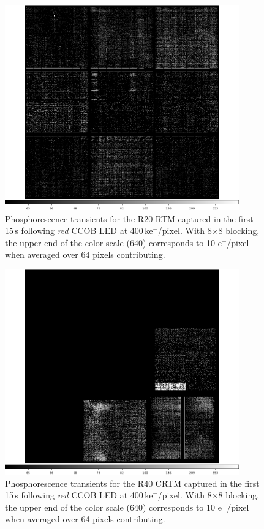 \begin{figure}[!htbp]
\centering
\includegraphics[width=0.9\textwidth]{figures/phosphorescence-survey/itl_fluor_R20_0-19_rb1_log.png}
\caption{Phosphorescence transients for the R20 RTM captured in the first 15\,s following {\it red} CCOB LED at 400\,ke$^-$/pixel. With 8$\times$8 blocking, the upper end of the color scale (640) corresponds to 10 e$^-$/pixel when averaged over 64 pixels contributing.}
\label{fig:phos:R20}
\end{figure}

\begin{figure}[!htbp]
\centering
\includegraphics[width=0.9\textwidth]{figures/phosphorescence-survey/itl_fluor_R40_0-19_rb1_log.png}
\caption{Phosphorescence transients for the R40 CRTM captured in the first 15\,s following {\it red} CCOB LED at 400\,ke$^-$/pixel. With 8$\times$8 blocking, the upper end of the color scale (640) corresponds to 10 e$^-$/pixel when averaged over 64 pixels contributing.}
\label{fig:phos:R40}
\end{figure}

